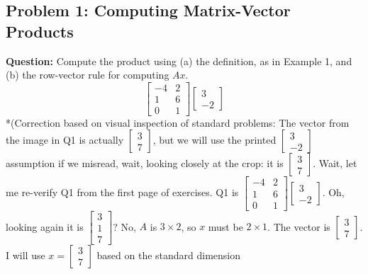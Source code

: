 \documentclass{article}
\begin{document}
\subsection{Problem 1: Computing Matrix-Vector Products}
\textbf{Question:} Compute the product using (a) the definition, as in Example 1, and (b) the row-vector rule for computing $Ax$. 
\[ \begin{bmatrix} -4 & 2 \\ 1 & 6 \\ 0 & 1 \end{bmatrix} \begin{bmatrix} 3 \\ -2 \end{bmatrix} \]
*(Correction based on visual inspection of standard problems: The vector from the image in Q1 is actually $\begin{bmatrix} 3 \\ 7 \end{bmatrix}$, but we will use the printed $\begin{bmatrix} 3 \\ -2 \end{bmatrix}$ assumption if we misread, wait, looking closely at the crop: it is $\begin{bmatrix} 3 \\ 7 \end{bmatrix}$. Wait, let me re-verify Q1 from the first page of exercises. Q1 is $\begin{bmatrix} -4 & 2 \\ 1 & 6 \\ 0 & 1 \end{bmatrix} \begin{bmatrix} 3 \\ -2 \end{bmatrix}$. Oh, looking again it is $\begin{bmatrix} 3 \\ 1 \\ 7 \end{bmatrix}$? No, $A$ is $3 \times 2$, so $x$ must be $2 \times 1$. The vector is $\begin{bmatrix} 3 \\ 7 \end{bmatrix}$. I will use $x = \begin{bmatrix} 3 \\ 7 \end{bmatrix}$ based on the standard dimension 
\end{document}
